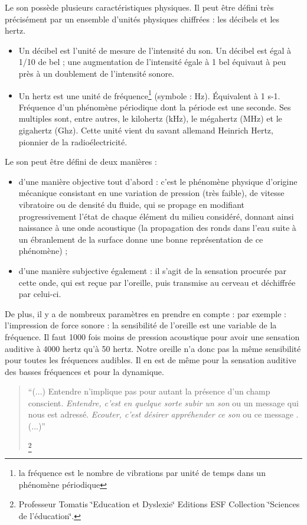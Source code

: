 Le son possède plusieurs caractéristiques physiques. Il peut être
défini très précisément par un ensemble d'unités physiques chiffrées
: les décibels et les hertz. 
\begin{itemize}
	\item Un décibel est l'unité de mesure de l'intensité du son. Un décibel
	est égal à 1/10 de bel ; une augmentation de l'intensité égale à 1
	bel équivaut à peu près à un doublement de l'intensité sonore. 
	\item Un hertz est une unité de fréquence\footnote{la fréquence est le nombre de vibrations par unité de temps dans un
		phénomène périodique} (symbole : Hz). Équivalent à 1 s-1. Fréquence d'un phénomène périodique
	dont la période est une seconde. Ses multiples sont, entre autres,
	le kilohertz (kHz), le mégahertz (MHz) et le gigahertz (Ghz). Cette
	unité vient du savant allemand Heinrich Hertz, pionnier de la radioélectricité.
\end{itemize}
Le son peut être défini de deux manières : 
\begin{itemize}
	\item d'une manière objective tout d'abord : c'est le phénomène physique
	d'origine mécanique consistant en une variation de pression (très
	faible), de vitesse vibratoire ou de densité du fluide, qui se propage
	en modifiant progressivement l'état de chaque élément du milieu considéré,
	donnant ainsi naissance à une onde acoustique (la propagation des
	ronds dans l'eau suite à un ébranlement de la surface donne une bonne
	représentation de ce phénomène) ; 
	\item d'une manière subjective également : il s'agit de la sensation procurée
	par cette onde, qui est reçue par l'oreille, puis transmise au cerveau
	et déchiffrée par celui-ci.
\end{itemize}
De plus, il y a de nombreux paramètres en prendre en compte : par
exemple : l'impression de force sonore : la sensibilité de l'oreille
est une variable de la fréquence. Il faut 1000 fois moins de pression
acoustique pour avoir une sensation auditive à 4000 hertz qu'à 50
hertz. Notre oreille n'a donc pas la même sensibilité pour toutes
les fréquences audibles. Il en est de même pour la sensation auditive
des basses fréquences et pour la dynamique. 
\begin{quote}
	``(...) Entendre n'implique pas pour autant la présence d'un champ
	conscient.\emph{ Entendre, c\textquoteright est en quelque sorte subir
		un son }ou un message qui nous est adressé. \emph{Ecouter, c'est désirer
		appréhender ce son }ou ce message . (...)'' 
	
	\footnote{Professeur Tomatis \char`\"{}Education et Dyslexie\char`\"{} Editions
		ESF Collection \char`\"{}Sciences de l'éducation\char`\"{}.}
\end{quote}





